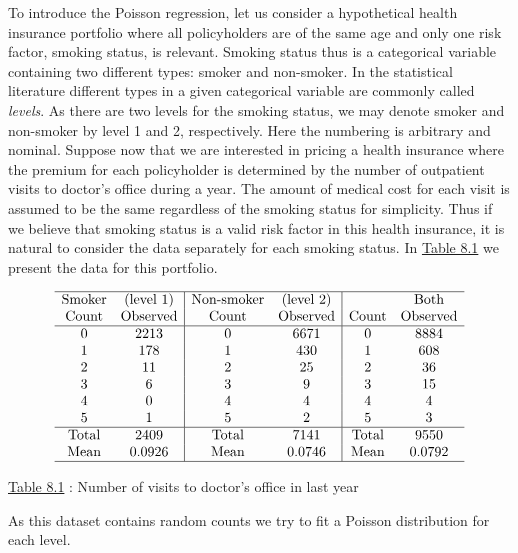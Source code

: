 \documentclass[]{book}
\theoremstyle{definition}
\theoremstyle{definition}
\theoremstyle{definition}
\theoremstyle{remark}
\begin{document}
To introduce the Poisson regression, let us consider a hypothetical
health insurance portfolio where all policyholders are of the same age
and only one risk factor, smoking status, is relevant. Smoking status
thus is a categorical variable containing two different types: smoker
and non-smoker. In the statistical literature different types in a given
categorical variable are commonly called \emph{levels}. As there are two
levels for the smoking status, we may denote smoker and non-smoker by
level 1 and 2, respectively. Here the numbering is arbitrary and
nominal. Suppose now that we are interested in pricing a health
insurance where the premium for each policyholder is determined by the
number of outpatient visits to doctor's office during a year. The amount
of medical cost for each visit is assumed to be the same regardless of
the smoking status for simplicity. Thus if we believe that smoking
status is a valid risk factor in this health insurance, it is natural to
consider the data separately for each smoking status. In
\protect\hyperlink{tab:8.1}{Table 8.1} we present the data for this
portfolio.

\[\begin{matrix}
\begin{array}{cc|cc|cc}
\hline
\text{Smoker} & \text{(level 1)}  & \text{Non-smoker}&\text{(level 2)}  & & \text{Both}\\
  \text{Count} & \text{Observed} &  \text{Count} & \text{Observed}  &   \text{Count} & \text{Observed} \\ \hline
0 & 2213 &   0 & 6671 &  0 & 8884 \\
1 & 178  &   1 & 430  &  1 & 608 \\
2 & 11   &   2 & 25   &  2 & 36 \\
3 & 6    &   3 & 9    &  3 & 15 \\
4 & 0    &   4 & 4    &  4 & 4 \\
5 & 1    &   5 & 2    &  5 & 3 \\ \hline
\text{Total} & 2409  &   \text{Total} & 7141 & \text{Total} & 9550 \\
\text{Mean} & 0.0926 &   \text{Mean} & 0.0746 & \text{Mean} & 0.0792 \\
\hline
    \end{array}
\end{matrix}\]

\protect\hyperlink{tab:8.1}{Table 8.1} : Number of visits to doctor's
office in last year

As this dataset contains random counts we try to fit a Poisson
distribution for each level.
\end{document}
